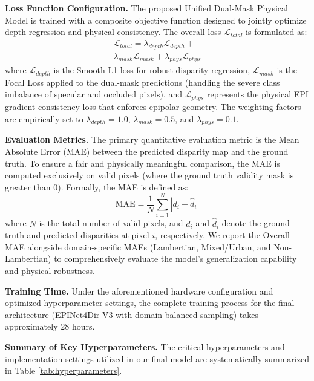 \documentclass[lettersize,journal]{IEEEtran}
\begin{document}
\textbf{Loss Function Configuration.} 
The proposed Unified Dual-Mask Physical Model is trained with a composite objective function designed to jointly optimize depth regression and physical consistency. The overall loss $\mathcal{L}_{total}$ is formulated as:
\begin{multline}
\mathcal{L}_{total} = \lambda_{depth} \mathcal{L}_{depth} +  \\
\lambda_{mask} \mathcal{L}_{mask} + \lambda_{phys} \mathcal{L}_{phys}
\label{eq:ch4_1}
\end{multline}
where $\mathcal{L}_{depth}$ is the Smooth L1 loss for robust disparity regression, $\mathcal{L}_{mask}$ is the Focal Loss applied to the dual-mask predictions (handling the severe class imbalance of specular and occluded pixels), and $\mathcal{L}_{phys}$ represents the physical EPI gradient consistency loss that enforces epipolar geometry. The weighting factors are empirically set to $\lambda_{depth} = 1.0$, $\lambda_{mask} = 0.5$, and $\lambda_{phys} = 0.1$.

\textbf{Evaluation Metrics.} 
The primary quantitative evaluation metric is the Mean Absolute Error (MAE) between the predicted disparity map and the ground truth. To ensure a fair and physically meaningful comparison, the MAE is computed exclusively on valid pixels (where the ground truth validity mask is greater than 0). Formally, the MAE is defined as:
\begin{equation}
\text{MAE} = \frac{1}{N} \sum_{i=1}^{N} |d_i - \hat{d}_i|
\label{eq:ch4_2}
\end{equation}
where $N$ is the total number of valid pixels, and $d_i$ and $\hat{d}_i$ denote the ground truth and predicted disparities at pixel $i$, respectively. We report the Overall MAE alongside domain-specific MAEs (Lambertian, Mixed/Urban, and Non-Lambertian) to comprehensively evaluate the model's generalization capability and physical robustness.

\textbf{Training Time.} 
Under the aforementioned hardware configuration and optimized hyperparameter settings, the complete training process for the final architecture (EPINet4Dir V3 with domain-balanced sampling) takes approximately 28 hours.

\textbf{Summary of Key Hyperparameters.}
The critical hyperparameters and implementation settings utilized in our final model are systematically summarized in Table \ref{tab:hyperparameters}.
\end{document}
